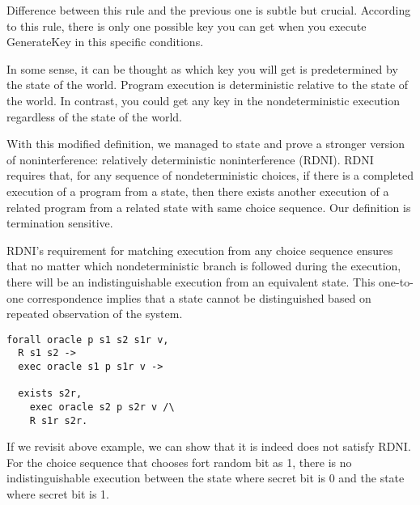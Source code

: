 Difference between this rule and the previous one is subtle but crucial. 
According to this rule, there is only one possible key you can get when you execute GenerateKey in this specific conditions.

In some sense, it can be thought as which key you will get is predetermined by the state of the world. Program execution is deterministic relative to the state of the world.
In contrast, you could get any key in the nondeterministic execution regardless of the state of the world.


With this modified definition, we managed to state and prove a stronger version of noninterference: relatively deterministic noninterference (RDNI). RDNI requires that, for any sequence of nondeterministic choices, if there is a completed execution of a program from a state, then there exists another execution of a related program from a related state with same choice sequence. Our definition is termination sensitive.

RDNI's requirement for matching execution from any choice sequence ensures that no matter which nondeterministic branch is followed during the execution, there will be an indistinguishable execution from an equivalent state. This one-to-one correspondence implies that a state cannot be distinguished based on repeated observation of the system.

\begin{lstlisting}
forall oracle p s1 s2 s1r v,
  R s1 s2 ->
  exec oracle s1 p s1r v ->

  exists s2r,
    exec oracle s2 p s2r v /\
    R s1r s2r.
\end{lstlisting}

If we revisit above example, we can show that it is indeed does not satisfy RDNI. For the choice sequence that chooses fort random bit as 1, there is no indistinguishable execution between the state where secret bit is 0 and the state where secret bit is 1.



